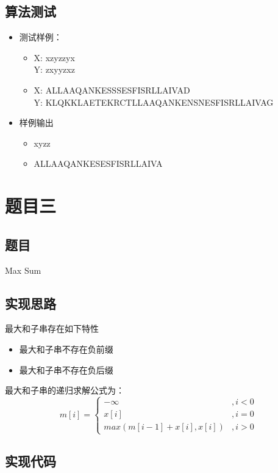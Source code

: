 \documentclass[a4paper]{article}
\begin{document}
\subsection{算法测试}

\begin{itemize}
\item
    测试样例：
    \begin{itemize}
    \item
        X: xzyzzyx\\
        Y: zxyyzxz
    \item
        X: ALLAAQANKESSSESFISRLLAIVAD\\
        Y: KLQKKLAETEKRCTLLAAQANKENSNESFISRLLAIVAG
    \end{itemize}
\item
    样例输出
    \begin{itemize}
    \item
        xyzz
    \item
        ALLAAQANKESESFISRLLAIVA
    \end{itemize}
\end{itemize}

\section{题目三}
\subsection{题目}
Max Sum
\subsection{实现思路}
最大和子串存在如下特性
\begin{itemize}
\item
    最大和子串不存在负前缀
\item
    最大和子串不存在负后缀

\end{itemize}
最大和子串的递归求解公式为：
\[m[i]=
    \left\{
        \begin{array}{ll}
            -\infty & ,i<0\\
            x[i] & ,i=0\\
            max(m[i-1]+x[i],x[i]) & ,i>0
        \end{array}
    \right.
\]
\subsection{实现代码}
\end{document}
